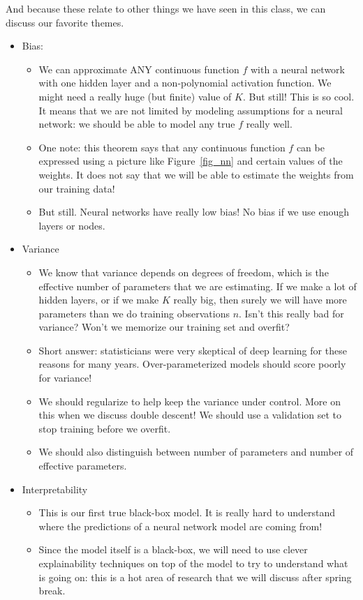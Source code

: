 And because these relate to other things we have seen in this class, we can discuss our favorite themes. 
\begin{itemize}
\item Bias:
\begin{itemize}
\item  We can approximate ANY continuous function $f$ with a neural network with one hidden layer and a non-polynomial activation function. We might need a really huge (but finite) value of $K$. But still! This is so cool. It means that we are not limited by modeling assumptions for a neural network: we should be able to model any true $f$ really well.
\item One note: this theorem	 says that any continuous function $f$ can be expressed using a picture like Figure~\ref{fig_nn} and certain values of the weights. It does not say that we will be able to estimate the weights from our training data! 
\item But still. Neural networks have really low bias! No bias if we use enough layers or nodes. 
\end{itemize}
\item Variance
\begin{itemize}
\item We know that variance depends on degrees of freedom, which is the effective number of parameters that we are estimating. If we make a lot of hidden layers, or if we make $K$ really big, then surely we will have more parameters than we do training observations $n$. Isn't this really bad for variance? Won't we memorize our training set and overfit?
\item Short answer: statisticians were very skeptical of deep learning for these reasons for many years. Over-parameterized models should score poorly for variance!	
\item We should regularize to help keep the variance under control. More on this when we discuss double descent! We should use a validation set to stop training before we overfit.
\item We should also distinguish between number of parameters and number of effective parameters. 
\end{itemize}
\item Interpretability
\begin{itemize}
\item This is our first true black-box model. It is really hard to understand where the predictions of a neural network model are coming from!
\item Since the model itself is a black-box, we will need to use clever explainability techniques on top of the model to try to understand what is going on: this is a hot area of research that we will discuss after spring break.  

\end{itemize}
\end{itemize}
